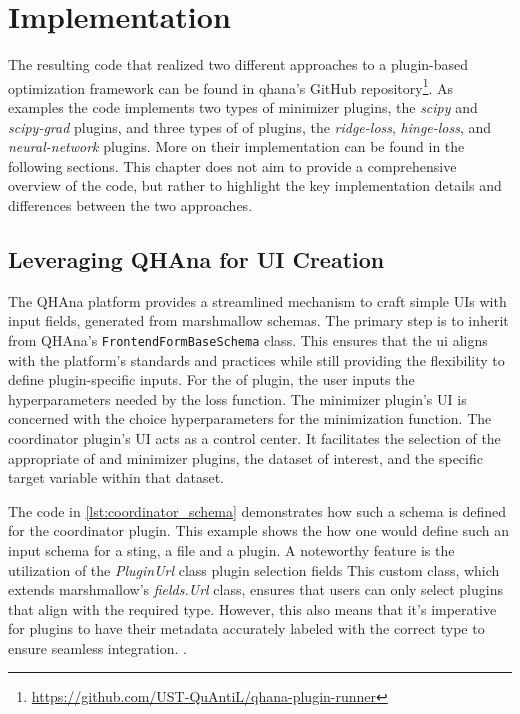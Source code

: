 \documentclass[
  a4paper,  %
  twoside,  %
  bibliography=totoc,
  headsepline,
  cleardoublepage=empty,
  parskip=half,
  draft=false
]{scrbook}
\begin{document}
\chapter{Implementation}
\label{chap:implementation}

The resulting code that realized two different approaches to a plugin-based optimization framework can be found in \gls{qhana}'s GitHub repository\footnote{\url{https://github.com/UST-QuAntiL/qhana-plugin-runner}}.
As examples the code implements two types of minimizer plugins, the \emph{scipy} and \emph{scipy-grad} plugins, and three types of \gls{of} plugins, the \emph{ridge-loss}, \emph{hinge-loss}, and \emph{neural-network} plugins.
More on their implementation can be found in the following sections.
This chapter does not aim to provide a comprehensive overview of the code, but rather to highlight the key implementation details and differences between the two approaches.







\section{Leveraging QHAna for UI Creation}
The QHAna platform provides a streamlined mechanism to craft simple UIs with input fields, generated from marshmallow schemas.
The primary step is to inherit from QHAna's \texttt{FrontendFormBaseSchema} class.
This ensures that the \gls{ui} aligns with the platform's standards and practices while still providing the flexibility to define plugin-specific inputs.
For the \gls{of} plugin, the user inputs the hyperparameters needed by the loss function.
The minimizer plugin's UI is concerned with the choice hyperparameters for the minimization function.
The coordinator plugin's UI acts as a control center.
It facilitates the selection of the appropriate \gls{of} and minimizer plugins, the dataset of interest, and the specific target variable within that dataset.

The code in \ref{lst:coordinator_schema} demonstrates how such a schema is defined for the coordinator plugin.
This example shows the how one would define such an input schema for a sting, a file and a plugin.
A noteworthy feature is the utilization of the \emph{PluginUrl} class plugin selection fields
This custom class, which extends marshmallow's \emph{fields.Url} class, ensures that users can only select plugins that align with the required type.
However, this also means that it's imperative for plugins to have their metadata accurately labeled with the correct type to ensure seamless integration.
.
\end{document}
